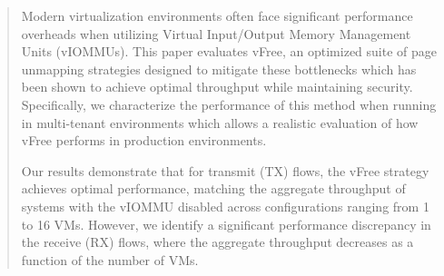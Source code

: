 \begin{abstract}

Modern virtualization environments often face significant performance overheads when utilizing Virtual Input/Output Memory Management Units (vIOMMUs). This paper evaluates vFree, an optimized suite of page unmapping strategies designed to mitigate these bottlenecks which has been shown to achieve optimal throughput while maintaining security. Specifically, we characterize the performance of this method when running in multi-tenant environments which allows a realistic evaluation of how vFree performs in production environments.

Our results demonstrate that for transmit (TX) flows, the vFree strategy achieves optimal performance, matching the aggregate throughput of systems with the vIOMMU disabled across configurations ranging from 1 to 16 VMs.  However, we identify a significant performance discrepancy in the receive (RX) flows, where the aggregate throughput decreases as a function of the number of VMs.

\end{abstract}
